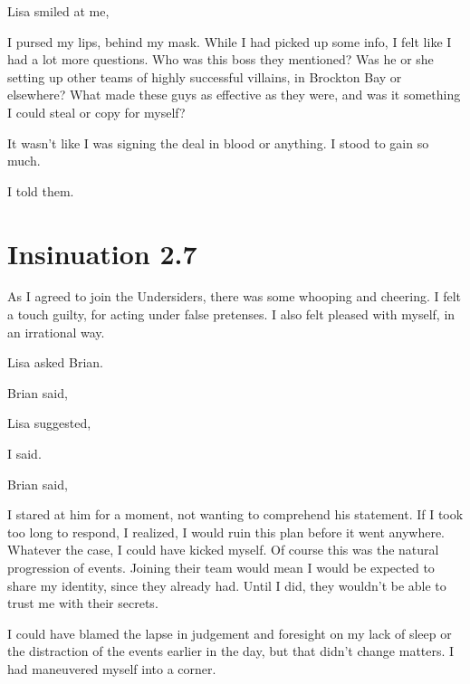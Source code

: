 Lisa smiled at me, 

I pursed my lips, behind my mask. While I had picked up some info, I felt like I had a lot more questions. Who was this boss they mentioned? Was he or she setting up other teams of highly successful villains, in Brockton Bay or elsewhere? What made these guys as effective as they were, and was it something I could steal or copy for myself?

It wasn't like I was signing the deal in blood or anything. I stood to gain so much.

 I told them.


\chapter{Insinuation 2.7}

As I agreed to join the Undersiders, there was some whooping and cheering. I felt a touch guilty, for acting under false pretenses. I also felt pleased with myself, in an irrational way.

 Lisa asked Brian.

 Brian said, 

 Lisa suggested, 

 I said.

 Brian said, 

I stared at him for a moment, not wanting to comprehend his statement. If I took too long to respond, I realized, I would ruin this plan before it went anywhere. Whatever the case, I could have kicked myself. Of course this was the natural progression of events. Joining their team would mean I would be expected to share my identity, since they already had. Until I did, they wouldn't be able to trust me with their secrets.

I could have blamed the lapse in judgement and foresight on my lack of sleep or the distraction of the events earlier in the day, but that didn't change matters. I had maneuvered myself into a corner.

